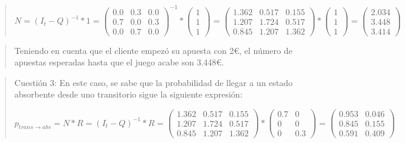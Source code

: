 \documentclass[
  a4paper,
  DIV=11,
  numbers=noendperiod]{scrreprt}
\begin{document}
\begin{quote}
\[
N= (I_t-Q)^{-1} * 1 = {\begin{pmatrix} 0.0 & 0.3 & 0.0 \\ 0.7 & 0.0 & 0.3 \\ 0.0 & 0.7 & 0.0 \end{pmatrix}}^{-1} *
\begin{pmatrix} 1 \\ 1 \\ 1 \end{pmatrix} = 
\begin{pmatrix} 1.362 & 0.517 & 0.155 \\ 1.207 & 1.724 & 0.517 \\ 0.845 &  1.207 & 1.362 \end{pmatrix} *
\begin{pmatrix} 1 \\ 1 \\ 1 \end{pmatrix} = \begin{pmatrix} 2.034 \\ 3.448 \\ 3.414 \end{pmatrix} 
\]
\end{quote}

\begin{quote}
Teniendo en cuenta que el cliente empezó su apuesta con 2€, el número de
apuestas esperadas hasta que el juego acabe son 3.448€.
\end{quote}

\begin{quote}
Cuestión 3: En este caso, se sabe que la probabilidad de llegar a un
estado absorbente desde uno transitorio sigue la siguiente expresión:

\[
p_{trans \rightarrow abs}= N * R = (I_t-Q)^{-1} * R = 
\begin{pmatrix} 1.362 & 0.517 & 0.155 \\ 1.207 & 1.724 & 0.517 \\ 0.845 &  1.207 & 1.362 \end{pmatrix} *
\begin{pmatrix} 0.7 & 0\\ 0 & 0 \\ 0 & 0.3 \end{pmatrix} = \begin{pmatrix} 0.953 & 0.046 \\ 0.845 & 0.155\\ 0.591 & 0.409 \end{pmatrix} 
\]
\end{quote}
\end{document}
